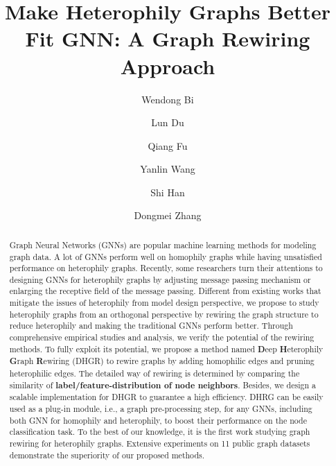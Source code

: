 \documentclass[sigconf]{acmart}
\begin{document}
\title{Make Heterophily Graphs Better Fit GNN: A Graph Rewiring Approach}

\author{Wendong Bi}
\author{Lun Du}

\author{Qiang Fu}

\author{Yanlin Wang}

\author{Shi Han}
  
\author{Dongmei Zhang}

\begin{abstract}
		Graph Neural Networks (GNNs) are popular machine learning methods for modeling graph data. A lot of GNNs perform well on homophily graphs while having unsatisfied performance on heterophily graphs. Recently, some researchers turn their attentions to designing GNNs for heterophily graphs by adjusting message passing mechanism or enlarging the receptive field of the message passing. Different from existing works that mitigate the issues of heterophily from model design perspective, we propose to study heterophily graphs from an orthogonal perspective by rewiring the graph structure to reduce heterophily and making the traditional GNNs perform better. Through comprehensive empirical studies and analysis, we verify the potential of the rewiring methods. To fully exploit its potential, we propose a method named \textbf{D}eep \textbf{H}eterophily \textbf{G}raph \textbf{R}ewiring (DHGR) to rewire graphs by adding homophilic edges and pruning heterophilic edges. The detailed way of rewiring is determined by comparing the similarity of \textbf{label/feature-distribution of node neighbors}. Besides, we design a scalable implementation for DHGR to guarantee a high efficiency. DHRG can be easily used as a plug-in module, i.e., a graph pre-processing step, for any GNNs, including both GNN for homophily and heterophily, to boost their performance on the node classification task. To the best of our knowledge, it is the first work studying graph rewiring for heterophily graphs. Extensive experiments on 11 public graph datasets demonstrate the superiority of our proposed methods.
	\end{abstract}
\end{document}
